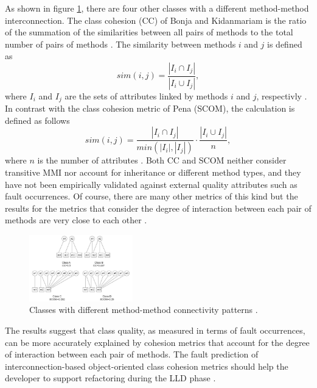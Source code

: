 As shown in figure \ref{fig2}, there are four other classes with a different method-method interconnection. The class cohesion (CC) of Bonja and Kidanmariam is the ratio of the summation of the similarities between all pairs of methods to the total number of pairs of methods \cite{bonja2006metrics}. The similarity between methods $i$ and $j$ is defined as
\begin{displaymath}
	sim(i,j)=\frac{|I_i \cap I_j|}{|I_i \cup I_j|} ,  
\end{displaymath}
where $I_i$ and $I_j$ are the sets of attributes linked by methods $i$ and $j$, respectivly \cite{b3al2012fault}. In contrast with the class cohesion metric of Pena (SCOM), the calculation is defined as follows
\begin{displaymath}
	sim(i,j)=\frac{|I_i \cap I_j|}{min(|I_i|, |I_j|)} \cdot \frac{|I_i \cup I_j|}{n},  
\end{displaymath}
where $n$ is the number of attributes \cite{fernandez2006sensitive}.
Both CC and SCOM neither consider transitive MMI nor account for inheritance or different method types, and they have not been empirically validated against external quality attributes such as fault occurrences. Of course, there are many other metrics of this kind but the results for the metrics that consider the degree of interaction between each pair of methods are very close to each other \cite{b8al2012precise}.

\begin{figure}[htbp]
	\centerline{\includegraphics[width=0.4\textwidth]{pictures/am2.png}}
	\caption{Classes with different method-method connectivity patterns \cite{b3al2012fault}.}
	\label{fig2}
\end{figure}

The results suggest that class quality, as measured in terms of fault occurrences, can be more accurately explained by cohesion metrics that account for the degree of interaction between each pair of methods. The fault prediction of interconnection-based object-oriented class cohesion metrics should help the developer to support refactoring during the LLD phase \cite{b8al2012precise}.


